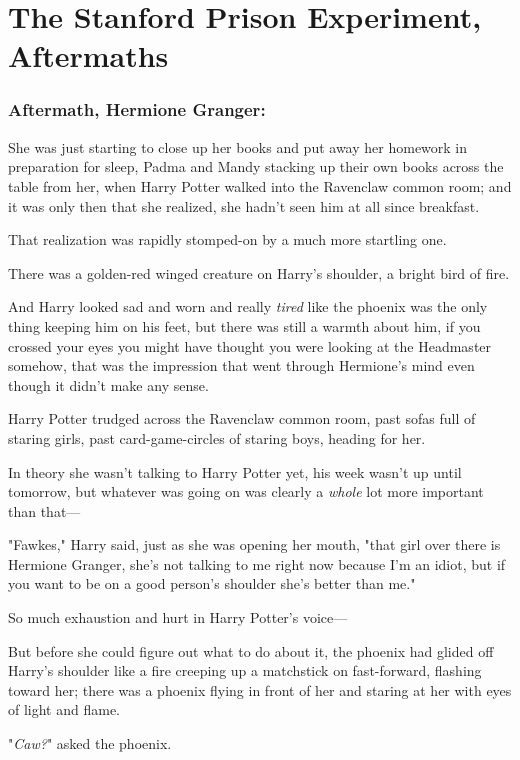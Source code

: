 \chapter{The Stanford Prison Experiment, Aftermaths}

\subsection{Aftermath, Hermione Granger:}

She was just starting to close up her books and put away her homework in
preparation for sleep, Padma and Mandy stacking up their own books across the
table from her, when Harry Potter walked into the Ravenclaw common room; and it
was only then that she realized, she hadn't seen him at all since breakfast.

That realization was rapidly stomped-on by a much more startling one.

There was a golden-red winged creature on Harry's shoulder, a bright bird of
fire.

And Harry looked sad and worn and really \emph{tired} like the phoenix was the
only thing keeping him on his feet, but there was still a warmth about him, if
you crossed your eyes you might have thought you were looking at the Headmaster
somehow, that was the impression that went through Hermione's mind even though
it didn't make any sense.

Harry Potter trudged across the Ravenclaw common room, past sofas full of
staring girls, past card-game-circles of staring boys, heading for her.

In theory she wasn't talking to Harry Potter yet, his week wasn't up until
tomorrow, but whatever was going on was clearly a \emph{whole} lot more
important than that---

"Fawkes," Harry said, just as she was opening her mouth, "that girl over there
is Hermione Granger, she's not talking to me right now because I'm an idiot,
but if you want to be on a good person's shoulder she's better than me."

So much exhaustion and hurt in Harry Potter's voice---

But before she could figure out what to do about it, the phoenix had glided off
Harry's shoulder like a fire creeping up a matchstick on fast-forward, flashing
toward her; there was a phoenix flying in front of her and staring at her with
eyes of light and flame.

"\emph{Caw?}" asked the phoenix.

